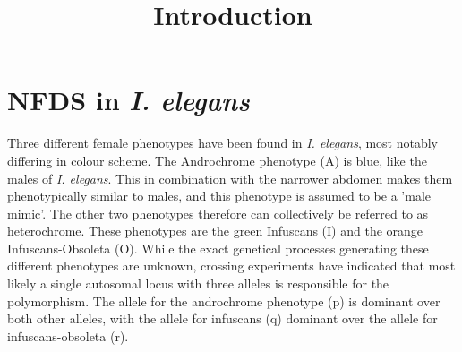 \documentclass{article}
\title{Introduction}
\date{\vspace{-5ex}}
\begin{document}
\maketitle
\section{NFDS in \textit{I. elegans}}
Three different female phenotypes have been found in \textit{I. elegans}, most notably differing in colour scheme. The Androchrome phenotype (A) is blue, like the males of \textit{I. elegans}. This in combination with the narrower abdomen makes them phenotypically similar to males, and this phenotype is assumed to be a 'male mimic'. The other two phenotypes therefore can collectively be referred to as heterochrome. These phenotypes are the green Infuscans (I) and the orange Infuscans-Obsoleta (O). While the exact genetical processes generating these different phenotypes are unknown, crossing experiments have indicated that most likely a single autosomal locus with three alleles is responsible for the polymorphism\cite{Cordero1990}. The allele for the androchrome phenotype (p) is dominant over both other alleles, with the allele for infuscans (q) dominant over the allele for infuscans-obsoleta (r)\cite{Cordero1990}. 

\printbibliography
\end{document}
